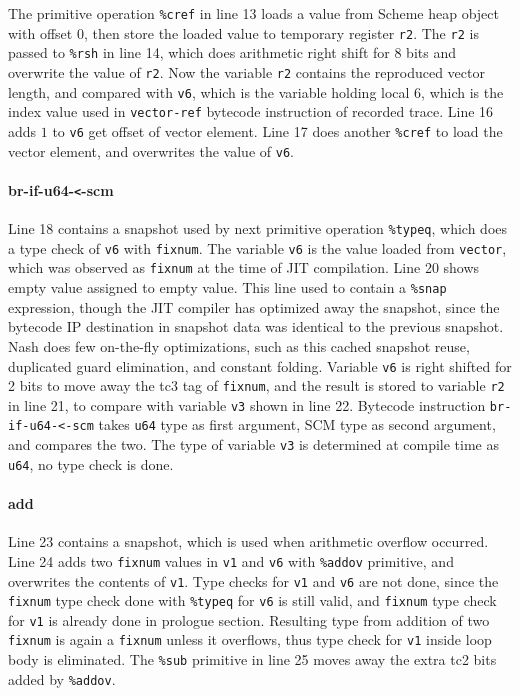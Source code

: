 \documentclass[preprint, 10pt]{sigplanconf}
\begin{document}
The primitive operation \texttt{\%cref} in line 13 loads a value from Scheme
heap object with offset 0, then store the loaded value to temporary register
\texttt{r2}. The \texttt{r2} is passed to \texttt{\%rsh} in line 14, which does
arithmetic right shift for 8 bits and overwrite the value of \texttt{r2}. Now
the variable \texttt{r2} contains the reproduced vector length, and compared
with \texttt{v6}, which is the variable holding local 6, which is the index
value used in \texttt{vector-ref} bytecode instruction of recorded trace. Line
16 adds $1$ to \texttt{v6} get offset of vector element. Line 17 does another
\texttt{\%cref} to load the vector element, and overwrites the value of
\texttt{v6}.

\paragraph{br-if-u64-\texttt{<}-scm} Line 18 contains a snapshot used by next
primitive operation \texttt{\%typeq}, which does a type check of \texttt{v6}
with \texttt{fixnum}. The variable \texttt{v6} is the value loaded from
\texttt{vector}, which was observed as \texttt{fixnum} at the time of JIT
compilation. Line 20 shows empty value assigned to empty value. This line used
to contain a \texttt{\%snap} expression, though the JIT compiler has optimized
away the snapshot, since the bytecode IP destination in snapshot data was
identical to the previous snapshot. Nash does few on-the-fly optimizations, such
as this cached snapshot reuse, duplicated guard elimination, and constant
folding.  Variable \texttt{v6} is right shifted for 2 bits to move away the tc3
tag of \texttt{fixnum}, and the result is stored to variable \texttt{r2} in line
21, to compare with variable \texttt{v3} shown in line 22. Bytecode instruction
\texttt{br-if-u64-<-scm} takes \texttt{u64} type as first argument, SCM type as
second argument, and compares the two. The type of variable \texttt{v3} is
determined at compile time as \texttt{u64}, no type check is done.

\paragraph{add} Line 23 contains a snapshot, which is used
when arithmetic overflow occurred. Line 24 adds two \texttt{fixnum} values in
\texttt{v1} and \texttt{v6} with \texttt{\%addov} primitive, and overwrites the
contents of \texttt{v1}. Type checks for \texttt{v1} and \texttt{v6} are not
done, since the \texttt{fixnum} type check done with \texttt{\%typeq} for
\texttt{v6} is still valid, and \texttt{fixnum} type check for \texttt{v1} is
already done in prologue section. Resulting type from addition of two
\texttt{fixnum} is again a \texttt{fixnum} unless it overflows, thus type check
for \texttt{v1} inside loop body is eliminated. The \texttt{\%sub} primitive in
line 25 moves away the extra tc2 bits added by \texttt{\%addov}.
\end{document}
